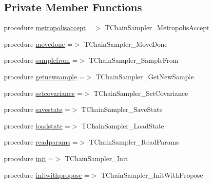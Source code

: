 \subsection*{Private Member Functions}
\begin{DoxyCompactItemize}
\item 
procedure \mbox{\hyperlink{structmontecarlo_1_1tchainsampler_a38810c14744153220394a622dd7a2ad3}{metropolisaccept}} =$>$ T\+Chain\+Sampler\+\_\+\+Metropolis\+Accept
\item 
procedure \mbox{\hyperlink{structmontecarlo_1_1tchainsampler_a6138b68a3e4b30031cf192190428c510}{movedone}} =$>$ T\+Chain\+Sampler\+\_\+\+Move\+Done
\item 
procedure \mbox{\hyperlink{structmontecarlo_1_1tchainsampler_ab6e59061d3f9fc8a9f3326544bc02d37}{samplefrom}} =$>$ T\+Chain\+Sampler\+\_\+\+Sample\+From
\item 
procedure \mbox{\hyperlink{structmontecarlo_1_1tchainsampler_a3edd52a15829b32df264ad24e2dd171c}{getnewsample}} =$>$ T\+Chain\+Sampler\+\_\+\+Get\+New\+Sample
\item 
procedure \mbox{\hyperlink{structmontecarlo_1_1tchainsampler_aceabb786825d8b4124bb92cf932bd202}{setcovariance}} =$>$ T\+Chain\+Sampler\+\_\+\+Set\+Covariance
\item 
procedure \mbox{\hyperlink{structmontecarlo_1_1tchainsampler_a3bd0e6012e5089f458735c5956b19368}{savestate}} =$>$ T\+Chain\+Sampler\+\_\+\+Save\+State
\item 
procedure \mbox{\hyperlink{structmontecarlo_1_1tchainsampler_af1eb90580ce946e10dda16632c9d28b0}{loadstate}} =$>$ T\+Chain\+Sampler\+\_\+\+Load\+State
\item 
procedure \mbox{\hyperlink{structmontecarlo_1_1tchainsampler_a59abcbff08402ef3ecec5a916b2039e9}{readparams}} =$>$ T\+Chain\+Sampler\+\_\+\+Read\+Params
\item 
procedure \mbox{\hyperlink{structmontecarlo_1_1tchainsampler_a616c1617aa6842c901afbc82fcfe2222}{init}} =$>$ T\+Chain\+Sampler\+\_\+\+Init
\item 
procedure \mbox{\hyperlink{structmontecarlo_1_1tchainsampler_a5cd99a84af5d4b4addc5fa975c5091d5}{initwithpropose}} =$>$ T\+Chain\+Sampler\+\_\+\+Init\+With\+Propose
\end{DoxyCompactItemize}
